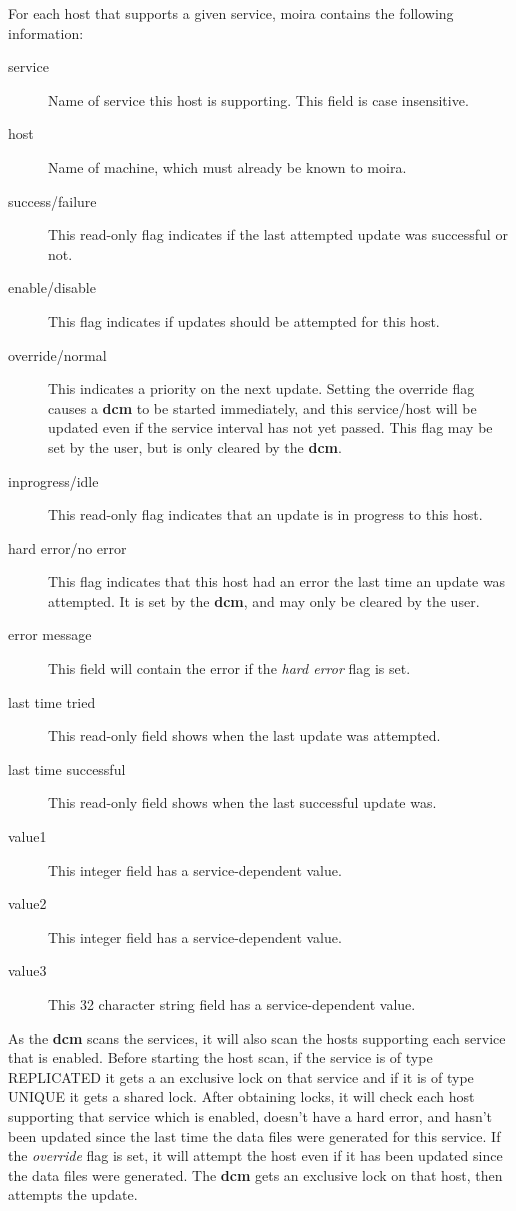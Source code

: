For each host that supports a given service, moira contains the
following information:
\begin{description}
\item[service] Name of service this host is supporting.  This field is case
insensitive.
\item[host] Name of machine, which must already be known to moira.
\item[success/failure] This read-only flag indicates if the last attempted update was
successful or not.
\item[enable/disable] This flag indicates if updates should be attempted for
this host.
\item[override/normal] This indicates a priority on the next update.
Setting the override flag causes a {\bf dcm} to be started immediately,
and this service/host will be updated even if the service interval has
not yet passed.  This flag may be set by the user, but is only cleared
by the {\bf dcm}.
\item[inprogress/idle] This read-only flag indicates that an update is in
progress to this host.
\item[hard error/no error] This flag indicates that this host had an error
the last time an update was attempted.  It is set by the {\bf dcm}, and
may only be cleared by the user.
\item[error message] This field will contain the error if the {\em hard error}
flag is set.
\item[last time tried] This read-only field shows when the last update was
attempted.
\item[last time successful] This read-only field shows when the last
successful update was.
\item[value1] This integer field has a service-dependent value.
\item[value2] This integer field has a service-dependent value.
\item[value3] This 32 character string field has a service-dependent value.
\end{description}

As the {\bf dcm} scans the services, it will also scan the hosts
supporting each service that is enabled.  Before starting the host
scan, if the service is of type REPLICATED it gets a an exclusive lock
on that service and if it is of type UNIQUE it gets a shared lock.
After obtaining locks, it will check each host supporting that service
which is enabled, doesn't have a hard error, and hasn't been updated
since the last time the data files were generated for this service.
If the {\em override} flag is set, it will attempt the host even if it
has been updated since the data files were generated.  The {\bf dcm}
gets an exclusive lock on that host, then attempts the update.

